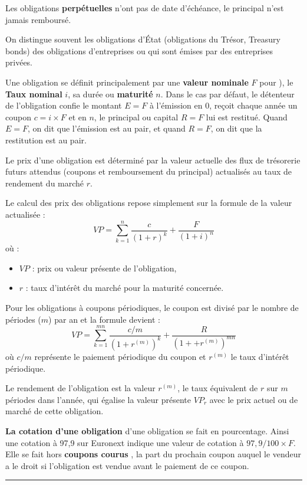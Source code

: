 \begin{f}
Les obligations \textbf{perpétuelles} n'ont pas de date d'échéance, le principal n'est jamais remboursé.
 
On distingue souvent les obligations d'État (obligations du Trésor, Treasury bonds) des
 obligations d'entreprises ou  qui sont émises par des entreprises privées.



Une obligation se définit principalement par une \textbf{valeur nominale} $F$ pour ), le \textbf{Taux nominal} $i$, sa durée ou \textbf{maturité} $n$.
Dans le cas par défaut, le détenteur de l'obligation confie  le montant $E=F$ à l'émission en 0, reçoit chaque année un coupon $c=i\times F$ et en $n$, le principal ou capital $R=F$ lui est restitué.
Quand $E=F$, on dit que l'émission est au pair, et quand $R=F$, on dit que la restitution est au pair.


Le prix d'une obligation est déterminé par la valeur actuelle des flux de trésorerie futurs attendus (coupons et remboursement du principal) actualisés au taux de rendement du marché $r$.

Le calcul des prix des obligations repose simplement sur la formule de la valeur actualisée :
\[
VP = \sum_{k=1}^{n} \frac{c}{(1 + r)^k} + \frac{F}{(1 + i)^n}
 \]
où :
\begin{itemize}
	\item $VP$ : prix ou valeur présente de l'obligation,
	\item $r$ : taux d'intérêt du marché pour la maturité concernée.
\end{itemize}


Pour les obligations à coupons périodiques, le coupon est divisé par le nombre de périodes ($m$) par an et la formule devient :
\[ 
VP = \sum_{k=1}^{mn} \frac{c/m}{(1 + r^{(m)})^k} + \frac{R}{(1 + + r^{(m)})^{mn}}
 \]
 où $c/m$ représente le paiement périodique du coupon et $ r^{(m)}$ le taux d'intérêt périodique.

Le rendement de l'obligation est la valeur $ r^{(m)}$, le taux équivalent de $r$ sur $m$ périodes dans l'année,  qui égalise la valeur présente $VP_r$ avec le prix actuel ou de marché de cette obligation. 

\textbf{La cotation d'une obligation} d'une obligation se fait en pourcentage. Ainsi une cotation à 97,9  sur Euronext indique une valeur de cotation à $97,9 /100\times F$. 
Elle  se fait hors \textbf{coupons courus} , la part du prochain coupon auquel le vendeur a le droit si l'obligation est vendue avant le paiement de ce coupon.
\end{f}
\hrule

